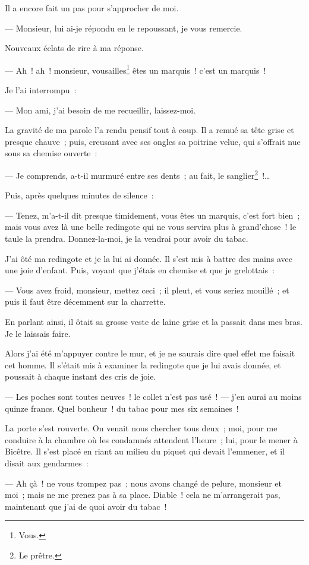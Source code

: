 \documentclass[french,twoside]{book} %
\begin{document}
Il a encore fait un pas pour s’approcher de moi.\par
— Monsieur, lui ai-je répondu en le repoussant, je vous remercie.\par
Nouveaux éclats de rire à ma réponse.\par
 — Ah ! ah ! monsieur, vousailles\footnote{ \noindent Vous.
 } êtes un marquis ! c’est un marquis !\par
Je l’ai interrompu :\par
— Mon ami, j’ai besoin de me recueillir, laissez-moi.\par
La gravité de ma parole l’a rendu pensif tout à coup. Il a remué sa tête grise et presque chauve ; puis, creusant avec ses ongles sa poitrine velue, qui s’offrait nue sous sa chemise ouverte :\par
— Je comprends, a-t-il murmuré entre ses dents ; au fait, le sanglier\footnote{ \noindent Le prêtre.
 } !…\par
Puis, après quelques minutes de silence :\par
— Tenez, m’a-t-il dit presque timidement, vous êtes un marquis, c’est fort bien ; mais vous avez là une belle redingote qui ne vous servira plus à grand’chose ! le taule la prendra. Donnez-la-moi, je la vendrai pour avoir du tabac.\par
J’ai ôté ma redingote et je la lui ai donnée. Il s’est mis à battre des mains avec une joie d’enfant. Puis, voyant que j’étais en chemise et que je grelottais :\par
— Vous avez froid, monsieur, mettez ceci ; il pleut, et vous seriez mouillé ; et puis il faut être décemment sur la charrette.\par
En parlant ainsi, il ôtait sa grosse veste de laine grise et la passait dans mes bras. Je le laissais faire.\par
Alors j’ai été m’appuyer contre le mur, et je ne saurais dire quel effet me faisait cet homme. Il s’était  mis à examiner la redingote que je lui avais donnée, et poussait à chaque instant des cris de joie.\par
— Les poches sont toutes neuves ! le collet n’est pas usé ! — j’en aurai au moins quinze francs. Quel bonheur ! du tabac pour mes six semaines !\par
La porte s’est rouverte. On venait nous chercher tous deux ; moi, pour me conduire à la chambre où les condamnés attendent l’heure ; lui, pour le mener à Bicêtre. Il s’est placé en riant au milieu du piquet qui devait l’emmener, et il disait aux gendarmes :\par
— Ah çà ! ne vous trompez pas ; nous avons changé de pelure, monsieur et moi ; mais ne me prenez pas à sa place. Diable ! cela ne m’arrangerait pas, maintenant que j’ai de quoi avoir du tabac !
\end{document}
